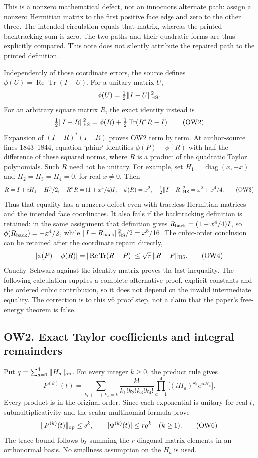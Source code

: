 \documentclass[11pt]{article}
\begin{document}
This is a nonzero mathematical defect, not an innocuous alternate path: assign a nonzero Hermitian matrix to the first positive face edge and zero to the other three. The intended circulation equals that matrix, whereas the printed backtracking sum is zero. The two paths and their quadratic forms are thus explicitly compared. This note does not silently attribute the repaired path to the printed definition.

Independently of those coordinate errors, the source defines \(\phi(U)=\operatorname{Re}\operatorname{Tr}(I-U)\). For a unitary matrix \(U\),
\[
 \phi(U)=\tfrac12\|I-U\|_{\rm HS}^{2}.
\]
For an arbitrary square matrix \(R\), the exact identity instead is
\[
 \tfrac12\|I-R\|_{\rm HS}^{2}
 =\phi(R)+\tfrac12\operatorname{Tr}(R^*R-I).              \tag{OW2}
\]
Expansion of \((I-R)^*(I-R)\) proves OW2 term by term. At author-source lines 1843–1844, equation `phiur` identifies \(\phi(P)-\phi(R)\) with half the difference of these squared norms, where \(R\) is a product of the quadratic Taylor polynomials. Such \(R\) need not be unitary. For example, set \(H_1=\operatorname{diag}(x,-x)\) and \(H_2=H_3=H_4=0\), for real \(x\ne0\). Then
\[
 R=I+iH_1-H_1^2/2,\quad
 R^*R=(1+x^4/4)I,\quad
 \phi(R)=x^2,\quad
 \tfrac12\|I-R\|_{\rm HS}^{2}=x^2+x^4/4.                 \tag{OW3}
\]
Thus that equality has a nonzero defect even with traceless Hermitian matrices and the intended face coordinates. It also fails if the backtracking definition is retained: in the same assignment that definition gives \(R_{\rm back}=(1+x^4/4)I\), so \(\phi(R_{\rm back})=-x^4/2\), while \(\|I-R_{\rm back}\|_{\rm HS}^2/2=x^8/16\). The cubic-order conclusion can be retained after the coordinate repair: directly,
\[
 |\phi(P)-\phi(R)|
 =|\operatorname{Re}\operatorname{Tr}(R-P)|
 \le\sqrt r\,\|R-P\|_{\rm HS}.                          \tag{OW4}
\]
Cauchy–Schwarz against the identity matrix proves the last inequality. The following calculation supplies a complete alternative proof, explicit constants and the ordered cubic contribution, so it does not depend on the invalid intermediate equality. The correction is to this v6 proof step, not a claim that the paper's free-energy theorem is false.

\subsection*{OW2. Exact Taylor coefficients and integral remainders}

Put \(q=\sum_{a=1}^4\|H_a\|_{\rm op}\). For every integer \(k\ge0\), the product rule gives
\[
 P^{(k)}(t)=\sum_{k_1+\cdots+k_4=k}
 \frac{k!}{k_1!k_2!k_3!k_4!}
 \prod_{a=1}^4\big[(iH_a)^{k_a}e^{itH_a}\big].          \tag{OW5}
\]
Every product is in the original order. Since each exponential is unitary for real \(t\), submultiplicativity and the scalar multinomial formula prove
\[
 \|P^{(k)}(t)\|_{\rm op}\le q^k,\qquad
 |\Phi^{(k)}(t)|\le r q^k\quad(k\ge1).                 \tag{OW6}
\]
The trace bound follows by summing the \(r\) diagonal matrix elements in an orthonormal basis. No smallness assumption on the \(H_a\) is used.
\end{document}
